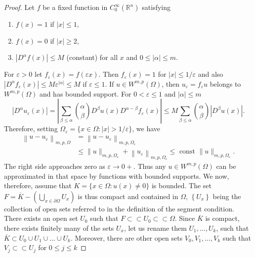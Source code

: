 \begin{proof}
  Let $f$ be a fixed function in $C_0^{\infty}\left(\mathbb{R}^n\right)$ satisfying
  \begin{enumerate}[label = (\roman*)]
    \item $f(x)=1$ if $|x| \leq 1$,
    \item $f(x)=0$ if $|x| \geq 2$,
    \item $\left|D^\alpha f(x)\right| \leq M$ (constant) for all $x$ and $0 \leq|\alpha| \leq m$.
  \end{enumerate}
  For $\varepsilon>0$ let $f_\varepsilon(x)=f(\varepsilon x)$.
  Then $f_\varepsilon(x)=1$ for $|x| \leq 1 / \varepsilon$
  and also $\left|D^\alpha f_\varepsilon(x)\right| \leq M \varepsilon^{|\alpha|} \leq M$
  if $\varepsilon \leq 1$. If $u \in W^{m,p}(\Omega)$, then $u_\varepsilon=f_\varepsilon u$
  belongs to $W^{m,p}(\Omega)$ and has bounded support.
  For $0<\varepsilon \leq 1$ and $|\alpha| \leq m$
  \[
  \left|D^\alpha u_\varepsilon(x)\right|=\left|\sum_{\beta \leq \alpha}\binom{\alpha}{\beta} D^\beta u(x) D^{\alpha-\beta} f_\varepsilon(x)\right| \leq M \sum_{\beta \leq \alpha}\binom{\alpha}{\beta}\left|D^\beta u(x)\right| .
  \]
  Therefore, setting $\Omega_\varepsilon=\{x \in \Omega:|x|>1 / \varepsilon\}$, we have
  \[
  \begin{aligned}
  \left\|u-u_\varepsilon\right\|_{m, p, \Omega} & =\left\|u-u_\varepsilon\right\|_{m, p, \Omega_\varepsilon} \\
  & \leq\|u\|_{m, p, \Omega_\varepsilon}+\left\|u_\varepsilon\right\|_{m, p, \Omega_\varepsilon} \leq \text { const }\|u\|_{m, p, \Omega_\varepsilon} .
  \end{aligned}
  \]
  The right side approaches zero as $\varepsilon \rightarrow 0+$.
  Thus any $u \in W^{m,p}(\Omega)$ can be approximated in that space by functions
  with bounded supports.
  We now, therefore, assume that $K=\{x \in \Omega: u(x) \neq 0\}$ is bounded.
  The set $F=\overline{K}-\left(\bigcup_{x \in\partial\Omega} U_x\right)$
  is thus compact and contained in $\Omega$, $\left\{U_x\right\}$
  being the collection of open sets 
  referred to in the definition of the segment condition.
  There exists an open set $U_0$ such that $F \subset\subset U_0 \subset\subset \Omega$.
  Since $\overline{K}$ is compact, there exists finitely many of the sets $U_x$,
  let us rename them $U_1, \ldots, U_k$,
  such that $\overline{K} \subset U_0 \cup U_1 \cup \ldots \cup U_k$.
  Moreover, there are other open sets $V_0, V_1, \ldots, V_k$
  such that $V_j \subset\subset U_j$ for $0 \leq j \leq k$

\end{proof}
